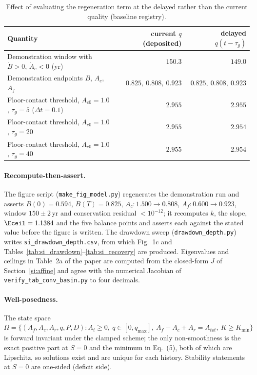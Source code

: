 \begin{table}[htbp]
\centering\small
\caption{Effect of evaluating the regeneration term at the delayed rather than the current quality (baseline registry).}
\label{tab:si_delay}
\begin{tabular}{l r r}
\toprule
Quantity & current $q$ (deposited) & delayed $q(t-\tau_g)$ \\
\midrule
Demonstration window with $\dot B>0$, $\dot A_c<0$ (yr) & $150.3$ & $149.0$ \\
Demonstration endpoints $B$, $A_c$, $A_f$ & $0.825,\ 0.808,\ 0.923$ & $0.825,\ 0.808,\ 0.923$ \\
Floor-contact threshold, $A_{c0}=1.0$, $\tau_g=5$ ($\Delta t=0.1$) & $2.955$ & $2.955$ \\
Floor-contact threshold, $A_{c0}=1.0$, $\tau_g=20$ & $2.955$ & $2.954$ \\
Floor-contact threshold, $A_{c0}=1.0$, $\tau_g=40$ & $2.955$ & $2.954$ \\
\bottomrule
\end{tabular}
\end{table}

\paragraph{Recompute-then-assert.} The figure script (\texttt{make\_fig\_model.py}) regenerates the demonstration run and asserts $B(0)=0.594$, $B(T)=0.825$, $A_c:1.500\to0.808$, $A_f:0.600\to0.923$, window $150\pm2$\,yr and conservation residual $<10^{-12}$; it recomputes $k$, the slope, $\Eceil=1.1384$ and the five balance points and asserts each against the stated value before the figure is written. The drawdown sweep (\texttt{drawdown\_depth.py}) writes \texttt{si\_drawdown\_depth.csv}, from which Fig.~1c and Tables~\ref{tab:si_drawdown}--\ref{tab:si_recovery} are produced. Eigenvalues and ceilings in Table~2a of the paper are computed from the closed-form $J$ of Section~\ref{si:affine} and agree with the numerical Jacobian of \texttt{verify\_tab\_conv\_basin.py} to four decimals.

\paragraph{Well-posedness.} The state space $\Omega=\{(A_f,A_c,A_r,q,P,D):A_i\ge0,\ q\in[0,q_{\max}],\ A_f+A_c+A_r=A_{tot},\ K\ge K_{\min}\}$ is forward invariant under the clamped scheme; the only non-smoothness is the exact positive part at $S=0$ and the minimum in Eq.~(5), both of which are Lipschitz, so solutions exist and are unique for each history. Stability statements at $S=0$ are one-sided (deficit side).

